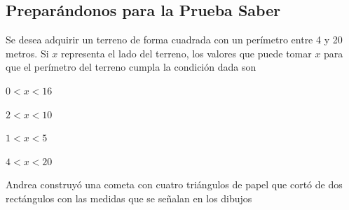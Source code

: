 \documentclass[fleqn]{article}
\begin{document}
\begin{enumerate}
   \section*{Preparándonos para la Prueba Saber}
\item Se desea adquirir un terreno de forma cuadrada con un perímetro entre 4 y 20 metros. Si $x$ representa el lado del terreno, los valores que puede tomar $x$ para que el
perímetro del terreno cumpla la condición dada son
\begin{enumerate}
\begin{multicols}{4}
\item $0<x<16$
\item $2<x<10$
\item $1<x<5$
\item $4<x<20$
\end{multicols}
\end{enumerate}
\begin{minipage}{.4\textwidth}
\item Andrea construyó una cometa con cuatro triángulos de papel que cortó de dos rectángulos con las medidas que se señalan en los dibujos
\end{minipage}
\begin{minipage}{.55\textwidth}
\end{minipage}


\end{enumerate}
\end{document}

